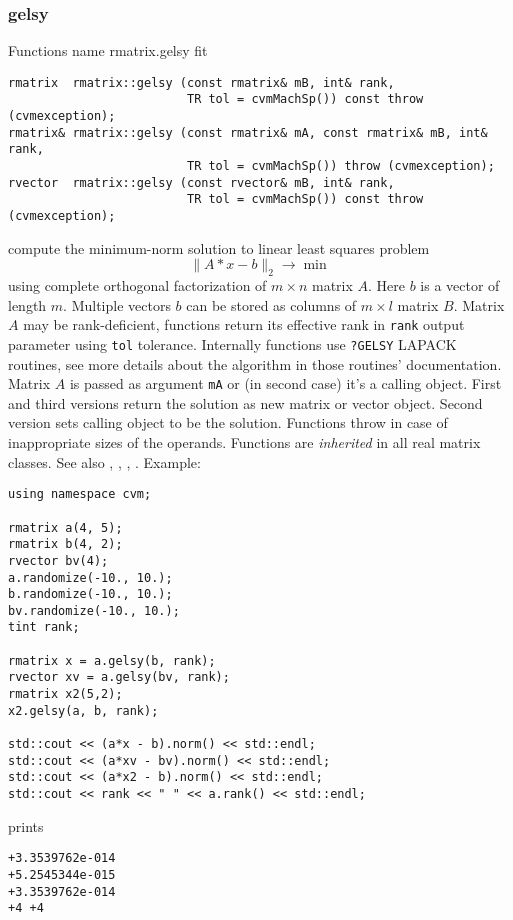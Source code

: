 \subsubsection{gelsy}
Functions%
\pdfdest name {rmatrix.gelsy} fit
\begin{verbatim}
rmatrix  rmatrix::gelsy (const rmatrix& mB, int& rank,
                         TR tol = cvmMachSp()) const throw (cvmexception);
rmatrix& rmatrix::gelsy (const rmatrix& mA, const rmatrix& mB, int& rank,
                         TR tol = cvmMachSp()) throw (cvmexception);
rvector  rmatrix::gelsy (const rvector& mB, int& rank,
                         TR tol = cvmMachSp()) const throw (cvmexception);
\end{verbatim}
compute the minimum-norm solution to  linear
least squares problem 
\begin{equation*}
\|A*x-b\|_2\to\min
\end{equation*}
using  complete orthogonal factorization of $m\times n$ matrix $A$.
Here $b$ is a vector of length $m$.
Multiple vectors $b$ can be stored as columns of $m\times l$ matrix $B$.
Matrix $A$ may be rank-deficient, functions return its effective rank in \verb"rank"
output parameter using \verb"tol" tolerance.
Internally functions use \verb"?GELSY" LAPACK routines, see more details
about the algorithm in those routines' documentation.
Matrix $A$ is passed as  argument \verb"mA" or (in second case) it's a calling object.
First and third versions return the solution as  new matrix or vector object.
Second version sets calling object to be the solution.
Functions throw
in case of inappropriate sizes of the operands.
Functions are \emph{inherited} in all real matrix classes.
See also , ,
, .
Example:
\begin{Verbatim}
using namespace cvm;

rmatrix a(4, 5);
rmatrix b(4, 2);
rvector bv(4);
a.randomize(-10., 10.);
b.randomize(-10., 10.);
bv.randomize(-10., 10.);
tint rank;

rmatrix x = a.gelsy(b, rank);
rvector xv = a.gelsy(bv, rank);
rmatrix x2(5,2);
x2.gelsy(a, b, rank);

std::cout << (a*x - b).norm() << std::endl;
std::cout << (a*xv - bv).norm() << std::endl;
std::cout << (a*x2 - b).norm() << std::endl;
std::cout << rank << " " << a.rank() << std::endl;
\end{Verbatim}
prints
\begin{Verbatim}
+3.3539762e-014
+5.2545344e-015
+3.3539762e-014
+4 +4
\end{Verbatim}
\newpage


